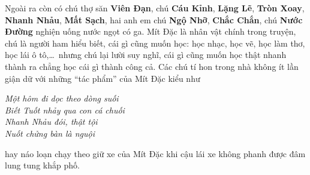 	\vskip 0.1cm
	Ngoài ra còn có chú thợ săn \textbf{\color{toancuabi}Viên Đạn}, chú \textbf{\color{toancuabi}Cáu Kỉnh}, \textbf{\color{toancuabi}Lặng Lẽ}, \textbf{\color{toancuabi}Tròn Xoay}, \textbf{\color{toancuabi}Nhanh Nhảu}, \textbf{\color{toancuabi}Mất Sạch}, hai anh em chú \textbf{\color{toancuabi}Ngộ Nhỡ}, \textbf{\color{toancuabi}Chắc Chắn}, chú \textbf{\color{toancuabi}Nước Đường} nghiện uống nước ngọt có ga.
	\vskip 0.1cm
	Mít Đặc là nhân vật chính trong truyện, chú là người ham hiểu biết, cái gì cũng muốn học: học nhạc, học vẽ, học làm thơ, học lái ô tô,\ldots \, nhưng chú lại lười suy nghĩ, cái gì cũng muốn học thật nhanh thành ra chẳng học cái gì thành công cả.
	\vskip 0.1cm
	Các chú tí hon trong nhà không ít lần giận dữ với những “tác phẩm” của Mít Đặc kiểu như
	\vskip 0.1cm
	\begin{adjustwidth}{100pt}{0pt}
		\begin{flushleft}
			\textit{Một hôm đi dọc theo dòng suối\\
				Biết Tuốt nhảy qua con cá chuối\\
				Nhanh Nhảu đói, thật tội\\
				Nuốt chửng bàn là nguội}
		\end{flushleft}
	\end{adjustwidth}
	\vskip 0.1cm
	hay náo loạn chạy theo giữ xe của Mít Đặc khi cậu lái xe không phanh được đâm lung tung khắp phố.
